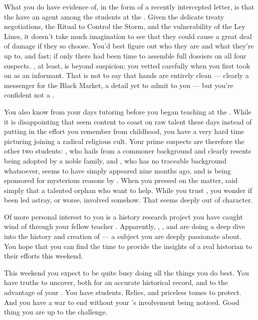 \documentclass[char]{GL2020}
\begin{document}
What you do have evidence of, in the form of a recently intercepted letter, is that the \pGoaties{} have an agent among the \pFarm{} students at the \pSchool{}. Given the delicate treaty negotiations, the Ritual to Control the Storm, and the vulnerability of the Ley Lines, it doesn't take much imagination to see that they could cause a great deal of damage if they so choose. You'd best figure out who they are and what they're up to, and fast; if only there had been time to assemble full dossiers on all four suspects. \cLibAssist{}, at least, is beyond suspicion; you vetted \cLibAssist{\them} carefully when you first took \cLibAssist{\them} on as an informant. That is not to say that \cLibAssist{\their} hands are entirely clean — \cLibAssist{\theyare} clearly a messenger for the Black Market, a detail \cLibAssist{\theyhave} yet to admit to you — but you're confident \cLibAssist{\theyare} not a \pGoatie{}. 

You also know \cChupStudent{\full} from your days tutoring \cChupStudent{\them} before you began teaching at the \pSchool{}. While it is disappointing that \cChupStudent{\they} seem\cChupStudent{\verbs} content to coast on \cChupStudent{\their} raw talent these days instead of putting in the effort you remember from \cChupStudent{\their}childhood, you have a very hard time picturing \cChupStudent{\them} joining a radical religious cult. Your prime suspects are therefore the other two \pFarm{} students: \cAdopted{\intro}, who hails from a commoner background and clearly resents being adopted by a noble family, and \cDisney{\intro}, who has no traceable background whatsoever, seems to have simply appeared nine months ago, and is being sponsored for mysterious reasons by \cWildCard{}. When you pressed \cWildCard{} on the matter, \cWildCard{\they} said simply that \cDisney{\theywere} a talented orphan who \cWildCard{\they} want to help. While you trust \cWildCard{}, you wonder if \cWildCard{\theyhave} been led astray, or worse, involved somehow. That seems deeply out of character. 

Of more personal interest to you is a history research project you have caught wind of through your fellow teacher \cBeetle{\full}. Apparently, \cEbbPriest{\intro}, \cHeadScientist{\intro}, and \cScholarship{\intro} are doing a deep dive into the history and creation of \pEarth{}— a subject you are deeply passionate about. You hope that you can find the time to provide the insights of a real historian to their efforts this weekend.

This weekend you expect to be quite busy doing all the things you do best. You have truths to uncover, both for an accurate historical record, and to the advantage of your \cQueen{\Monarch}. You have students, Relics, and priceless tomes to protect. And you have a war to end without your \cQueen{\Monarch}’s involvement being noticed. Good thing you are up to the challenge.
\end{document}
